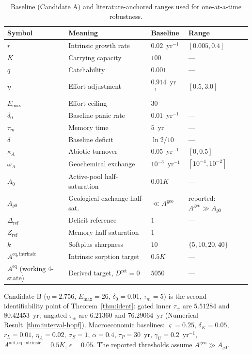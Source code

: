 \documentclass[11pt]{article}
\theoremstyle{definition}
\begin{document}
\begin{table}[h]
\centering\small
\caption{Baseline (Candidate A) and literature-anchored ranges used for one-at-a-time robustness.}
\label{tab:params}
\begin{tabular}{llll}
\toprule
Symbol & Meaning & Baseline & Range \\
\midrule
$r$ & Intrinsic growth rate & $0.02$~yr$^{-1}$ & $[0.005,0.4]$ \\
$K$ & Carrying capacity & $100$ & --- \\
$q$ & Catchability & $0.001$ & --- \\
$\eta$ & Effort adjustment & $0.914$~yr$^{-1}$ & $[0.5,3.0]$ \\
$E_{\max}$ & Effort ceiling & $30$ & --- \\
$\delta_0$ & Baseline panic rate & $0.01$~yr$^{-1}$ & --- \\
$\tau_m$ & Memory time & $5$~yr & --- \\
$\delta$ & Baseline deficit & $\ln 2/10$ & --- \\
$\kappa_A$ & Abiotic turnover & $0.05$~yr$^{-1}$ & $[0,0.5]$ \\
$\omega_A$ & Geochemical exchange & $10^{-3}$~yr$^{-1}$ & $[10^{-4},10^{-2}]$ \\
$A_0$ & Active-pool half-saturation & $0.01K$ & --- \\
$A_{g0}$ & Geological exchange half-sat.\ & $\ll A^{\mathrm{geo}}$ & reported: $A^{\mathrm{geo}}\gg A_{g0}$ \\
$\Delta_{\mathrm{ref}}$ & Deficit reference & $1$ & --- \\
$Z_{\mathrm{ref}}$ & Memory half-saturation & $1$ & --- \\
$k$ & Softplus sharpness & $10$ & $\{5,10,20,40\}$ \\
$A^{\mathrm{eq,intrinsic}}$ & Intrinsic sorption target & $0.5K$ & --- \\
$A^{\mathrm{eq}}$ (working 4-state) & Derived target, $D^{\mathrm{ret}}=0$ & $5050$ & --- \\
\bottomrule
\end{tabular}
\end{table}

Candidate B ($\eta=2.756$, $E_{\max}=26$, $\delta_0=0.01$, $\tau_m=5$) is the second identifiability point of Theorem~\ref{thm:ident}: gated inner $\tau_\pm$ are $5.51284$ and $80.42453$~yr; ungated $\tau_\pm$ are $6.21360$ and $76.29064$~yr (Numerical Result~\ref{thm:interval-hopf}). Macroeconomic baselines: $\varsigma=0.25$, $\delta_K=0.05$, $r_L=0.01$, $\eta_A=0.02$, $\sigma_S=1$, $\alpha=0.4$, $\tau_P=30$~yr, $\gamma_U=0.2$~yr$^{-1}$, $A^{\mathrm{act,eq,intrinsic}}=0.5K$, $\epsilon=0.05$. The reported thresholds assume $A^{\mathrm{geo}}\gg A_{g0}$.
\end{document}
